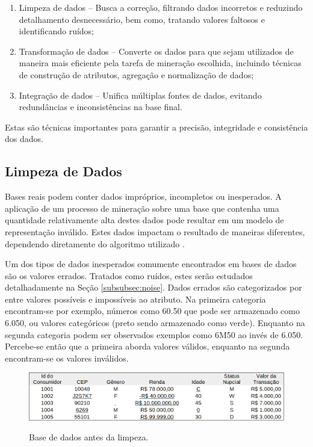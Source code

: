 \begin{enumerate}[label=\roman*.]
    \item Limpeza de dados {--} Busca a correção, filtrando dados incorretos e reduzindo detalhamento desnecessário, bem como, tratando valores faltosos e identificando ruídos;
    \item Transformação de dados {--} Converte os dados para que sejam utilizados de maneira mais eficiente pela tarefa de mineração escolhida, incluindo técnicas de construção de atributos, agregação e normalização de dados;
    \item Integração de dados {--} Unifica múltiplas fontes de dados, evitando redundâncias e inconsistências na base final.
\end{enumerate}
Estas são técnicas importantes para garantir a precisão, integridade e consistência dos dados.

\subsection{Limpeza de Dados}
\label{subsec:data-clean}

Bases reais podem conter dados impróprios, incompletos ou inesperados. A aplicação de um processo de mineração sobre uma base que contenha uma quantidade relativamente alta destes dados pode resultar em um modelo de representação inválido. Estes dados impactam o resultado de maneiras diferentes, dependendo diretamente do algoritmo utilizado \cite{han2000data}.

Um dos tipos de dados inesperados comumente encontrados em bases de dados são os valores errados. Tratados como ruídos, estes serão estudados detalhadamente na Seção \ref{subsubsec:noise}. Dados errados são categorizados por  entre valores possíveis e impossíveis ao atributo. Na primeira categoria encontram\hyp{}se por exemplo, números como 60.50 que pode ser armazenado como 6.050, ou valores categóricos (preto sendo armazenado como verde). Enquanto na segunda categoria podem ser observados exemplos como 6M50 ao invés de 6.050. Percebe-se então que a primeira aborda valores válidos, enquanto na segunda encontram\hyp{}se os valores inválidos.

\begin{figure}[H]
    \centering
    \caption{Base de dados antes da limpeza.}
    \includegraphics[width=\linewidth]{figuras/dirty-base.png}
    \label{fig:data-before-cleaning}
\end{figure}

